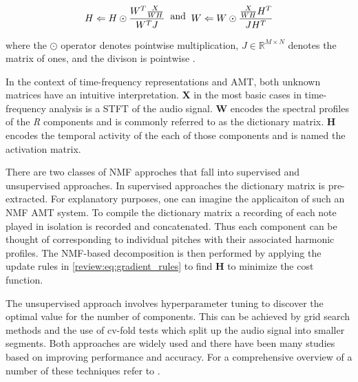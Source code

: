 \begin{equation}
  \begin{split}
    H \Leftarrow H \odot \frac{W^{T}\frac{X}{WH}}{W^{T}J}
  \end{split}
  \text{\;\;and\;\;}
  \begin{split}
    W \Leftarrow W \odot \frac{\frac{X}{WH}H^{T}}{JH^{T}}
  \end{split}
  \label{review:eq:gradient_rules}
\end{equation}

where the $\odot$ operator denotes pointwise multiplication, $J \in
  \mathbb{R}^{M \times N}$ denotes the matrix of ones, and the divison is
pointwise \cite{amt2019:Benetos}.

In the context of time-frequency representations and \ac{AMT}, both unknown matrices
have an intuitive interpretation. \textbf{X} in the most basic cases in
time-frequency analysis is a \ac{STFT} of the audio signal. \textbf{W} encodes the
spectral profiles of the \emph{R} components and is commonly referred to as the
dictionary matrix. \textbf{H} encodes the temporal activity of the each of those
components and is named the activation matrix.

There are two classes of \ac{NMF} approches that fall into supervised and
unsupervised approaches. In supervised approaches the dictionary matrix is
pre-extracted. For explanatory purposes, one can imagine the applicaiton of such
an \ac{NMF} \ac{AMT} system. To compile the dictionary matrix a recording of each note
played in isolation is recorded and concatenated. Thus each component can be
thought of corresponding to individual pitches with their associated harmonic
profiles. The \ac{NMF}-based decomposition is then performed by applying the update
rules in \autoref{review:eq:gradient_rules} to find \textbf{H} to minimize the
cost function.

The unsupervised approach involves hyperparameter tuning to discover the optimal
value for the number of components. This can be achieved by grid search methods
and the use of cv-fold tests which split up the audio signal into smaller segments.
Both approaches are widely used and there have been many studies based on improving performance and
accuracy. For a comprehensive overview of a number of these techniques refer to
\cite{f0estimation2006:Cheveigne,Christensen:2009, spmmt:Klapuri}.

